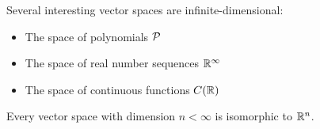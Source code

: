 \begin{applicationActivities}{3}{14}
\begin{observation}
  Several interesting vector spaces are infinite-dimensional:
  \begin{itemize}
    \item The space of polynomials \(\P\)
    \item The space of real number sequences \(\IR^\infty\)
    \item The space of continuous functions \(C(\IR)\)
  \end{itemize}
\end{observation}

\begin{fact}
  Every vector space with dimension \(n<\infty\) is isomorphic to \(\IR^n\).
\end{fact}

\end{applicationActivities}
